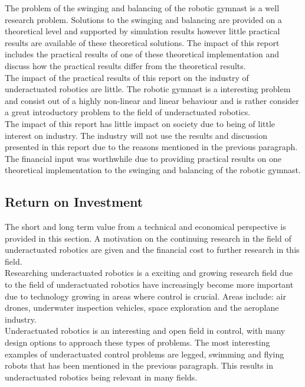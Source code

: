 The problem of the swinging and balancing of the robotic gymnast is a well research problem. Solutions to the swinging and balancing are provided on a theoretical level and supported by simulation results however little practical results are available of these theoretical solutions. The impact of this report includes the practical results of one of these theoretical implementation and discuss how the practical results differ from the theoretical results.\\

The impact of the practical results of this report on the industry of underactuated robotics are little. The robotic gymnast is a interesting problem and consist out of a highly non-linear and linear behaviour and is rather consider a great introductory problem to the field of underactuated robotics.\\

The impact of this report has little impact on society due to being of little interest on industry. The industry will not use the results and discussion presented in this report due to the reasons mentioned in the previous paragraph.\\

The financial input was worthwhile due to providing practical results on one theoretical implementation to the swinging and balancing of the robotic gymnast. \\


\subsection{Return on Investment}
The short and long term value from a technical and economical perspective is provided in this section. A motivation on the continuing research in the field of underactuated robotics are given and the financial cost to further research in this field.\\

Researching underactuated robotics is a exciting and growing research field due to the field of underactuated robotics have increasingly become more important due to technology growing in areas where control is crucial. Areas include: air drones, underwater inspection vehicles, space exploration and the aeroplane industry. \\

Underactuated robotics is an interesting and open field in control, with many design options to approach these types of problems. The most interesting examples of underactuated control problems are legged, swimming and flying robots that has been mentioned in the previous paragraph. This results in underactuated robotics being relevant in many fields.\\

